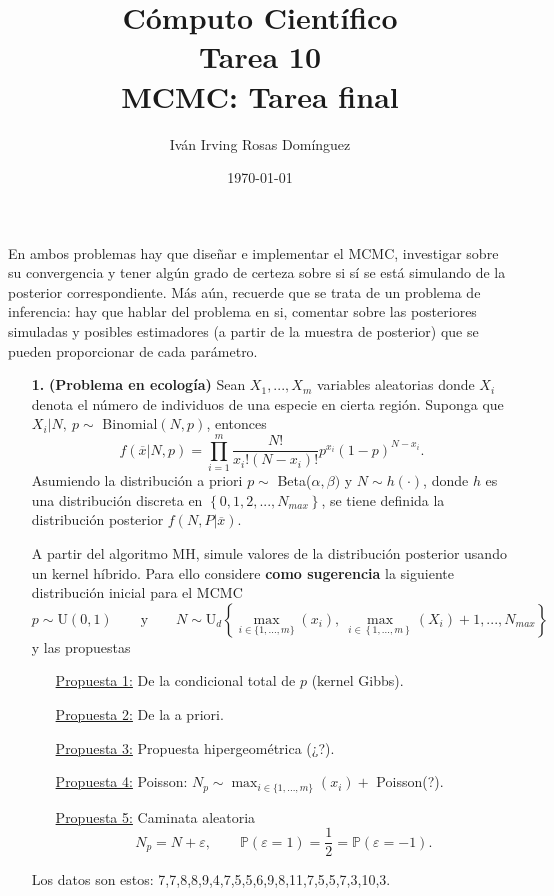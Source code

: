 \documentclass[letterpaper]{article}
\title{\textbf{Cómputo Científico\\
Tarea 10\\
MCMC: Tarea final}}
\author{Iván Irving Rosas Domínguez}
\date{\today}
\renewcommand{\P}{\mathbb{P}}
\newcommand{\1}{\mathds{1}}
\theoremstyle{definition}
\theoremstyle{definition}
\theoremstyle{definition}
\theoremstyle{definition}
\theoremstyle{definition}
\begin{document}
\maketitle


En ambos problemas hay que diseñar e implementar el MCMC, investigar sobre su convergencia 
y tener algún grado de certeza sobre si sí se está simulando de la posterior correspondiente.
Más aún, recuerde que se trata de un problema de inferencia: hay que hablar del problema en si,
comentar sobre las posteriores simuladas y posibles estimadores (a partir de la muestra de posterior)
que se pueden proporcionar de cada parámetro.
\begin{itemize}
    \item[\textbf{1.}]\textbf{(Problema en ecología)} Sean $X_1,...,X_m$ variables aleatorias 
    donde $X_i$ denota el número de individuos de una especie en cierta región. Suponga que 
    $X_i\big|N, \ p\sim$ Binomial$(N,p)$, entonces 
    \[
    f(\overline{x}|N,p)=\prod_{i=1}^{m}\frac{N!}{x_i!(N-x_i)!}p^{x_i}(1-p)^{N-x_i}.    
    \]
    Asumiendo la distribución a priori $p\sim$ Beta($\alpha,\beta)$ y $N\sim h(\cdot)$, donde
    $h$ es una distribución discreta en $\left\{0,1,2,...,N_{max}\right\}$, se tiene 
    definida la distribución posterior $f(N,P|\overline{x})$.

    A partir del algoritmo MH, simule valores de la distribución posterior usando un kernel híbrido.
    Para ello considere \textbf{como sugerencia} la siguiente distribución inicial para el MCMC
    \[
    p\sim \text{U}(0,1) \qquad \text{y} \qquad N\sim \text{U}_d\left\{\max_{i\in \{1,...,m\}}(x_i), \ \max_{i\in \left\{1,...,m\right\}}(X_i)+1,...,N_{max}\right\}    
    \]
    y las propuestas 
    \begin{itemize}
        \item[\underline{Propuesta 1:}] De la condicional total de $p$ (kernel Gibbs).
        \item[\underline{Propuesta 2:}] De la a priori.
        \item[\underline{Propuesta 3:}] Propuesta hipergeométrica (¿?).
        \item[\underline{Propuesta 4:}] Poisson: $N_p\sim \max_{i\in \{1,...,m\}}(x_i) +$ Poisson(?).
        \item[\underline{Propuesta 5:}] Caminata aleatoria
        \[
        N_p=N+\varepsilon, \qquad \P\left(\varepsilon=1\right)=\frac{1}{2}=\P\left(\varepsilon=-1\right).
        \]
    \end{itemize}
    Los datos son estos: 7,7,8,8,9,4,7,5,5,6,9,8,11,7,5,5,7,3,10,3.


\end{itemize}
\end{document}
